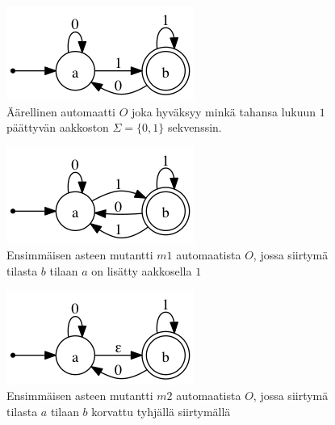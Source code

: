 \documentclass{tktltiki}
\begin{document}
\begin{figure}[here]
\caption{Äärellinen automaatti $O$ joka hyväksyy minkä tahansa lukuun $1$ päättyvän aakkoston $\Sigma = \{0,1\}$ sekvenssin.}
\label{fig:nfa}
\includegraphics{automaatit/nfa.png}
\end{figure}

\begin{figure}[here]
\caption{Ensimmäisen asteen mutantti $m1$ automaatista $O$, jossa siirtymä tilasta $b$ tilaan $a$ on lisätty aakkosella $1$}
\label{fig:m1}
\includegraphics{automaatit/m1.png}
\end{figure}

\begin{figure}[here]
\caption{Ensimmäisen asteen mutantti $m2$ automaatista $O$, jossa siirtymä tilasta $a$ tilaan $b$ korvattu tyhjällä siirtymällä}
\label{fig:m2}
\includegraphics{automaatit/m2.png}
\end{figure}
\end{document}

